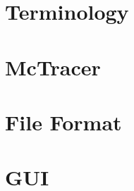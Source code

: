 \documentclass{scrartcl}
\begin{document}
\maketitle
\tableofcontents
\newpage

\section{Terminology} 
\newpage
\section{McTracer} 
\newpage
\section{File Format} 
\newpage
\section{GUI} 
\end{document}
